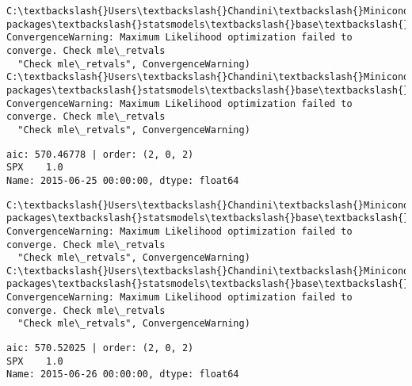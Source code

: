 \documentclass[11pt]{article}
\begin{document}
    \begin{Verbatim}[commandchars=\\\{\}]
C:\textbackslash{}Users\textbackslash{}Chandini\textbackslash{}Miniconda3\textbackslash{}envs\textbackslash{}auquan\textbackslash{}lib\textbackslash{}site-packages\textbackslash{}statsmodels\textbackslash{}base\textbackslash{}model.py:496: ConvergenceWarning: Maximum Likelihood optimization failed to converge. Check mle\_retvals
  "Check mle\_retvals", ConvergenceWarning)
C:\textbackslash{}Users\textbackslash{}Chandini\textbackslash{}Miniconda3\textbackslash{}envs\textbackslash{}auquan\textbackslash{}lib\textbackslash{}site-packages\textbackslash{}statsmodels\textbackslash{}base\textbackslash{}model.py:496: ConvergenceWarning: Maximum Likelihood optimization failed to converge. Check mle\_retvals
  "Check mle\_retvals", ConvergenceWarning)

    \end{Verbatim}

    \begin{Verbatim}[commandchars=\\\{\}]
aic: 570.46778 | order: (2, 0, 2)
SPX    1.0
Name: 2015-06-25 00:00:00, dtype: float64

    \end{Verbatim}

    \begin{Verbatim}[commandchars=\\\{\}]
C:\textbackslash{}Users\textbackslash{}Chandini\textbackslash{}Miniconda3\textbackslash{}envs\textbackslash{}auquan\textbackslash{}lib\textbackslash{}site-packages\textbackslash{}statsmodels\textbackslash{}base\textbackslash{}model.py:496: ConvergenceWarning: Maximum Likelihood optimization failed to converge. Check mle\_retvals
  "Check mle\_retvals", ConvergenceWarning)
C:\textbackslash{}Users\textbackslash{}Chandini\textbackslash{}Miniconda3\textbackslash{}envs\textbackslash{}auquan\textbackslash{}lib\textbackslash{}site-packages\textbackslash{}statsmodels\textbackslash{}base\textbackslash{}model.py:496: ConvergenceWarning: Maximum Likelihood optimization failed to converge. Check mle\_retvals
  "Check mle\_retvals", ConvergenceWarning)

    \end{Verbatim}

    \begin{Verbatim}[commandchars=\\\{\}]
aic: 570.52025 | order: (2, 0, 2)
SPX    1.0
Name: 2015-06-26 00:00:00, dtype: float64

    \end{Verbatim}
\end{document}
